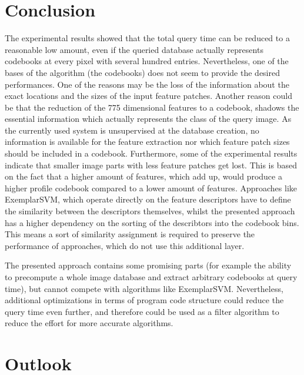 \chapter{Conclusion}

The experimental results showed that the total query time can be reduced to a reasonable low amount, even if the queried database actually represents codebooks at every pixel with several hundred entries. Nevertheless, one of the bases of the algorithm (the codebooks) does not seem to provide the desired performances. One of the reasons may be the loss of the information about the exact locations and the sizes of the input feature patches. Another reason could be that the reduction of the 775 dimensional features to a codebook, shadows the essential information which actually represents the class of the query image. As the currently used system is unsupervised at the database creation, no information is available for the feature extraction nor which feature patch sizes should be included in a codebook. Furthermore, some of the experimental results indicate that smaller image parts with less feature patches get lost. This is based on the fact that a higher amount of features, which add up, would produce a higher profile codebook compared to a lower amount of features. Approaches like ExemplarSVM, which operate directly on the feature descriptors have to define the similarity between the descriptors themselves, whilst the presented approach has a higher dependency on the sorting of the describtors into the codebook bins. This means a sort of similarity assignment is required to preserve the performance of approaches, which do not use this additional layer.

The presented approach contains some promising parts (for example the ability to precompute a whole image database and extract arbitrary codebooks at query time), but cannot compete with algorithms like ExemplarSVM. Nevertheless, additional optimizations in terms of program code structure could reduce the query time even further, and therefore could be used as a filter algorithm to reduce the effort for more accurate algorithms.

\chapter{Outlook}

